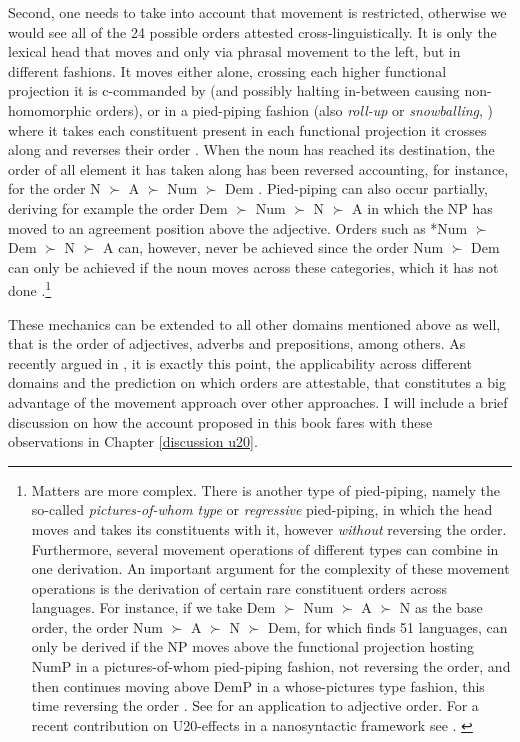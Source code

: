 \documentclass [output=book,colorlinks,citecolor=brown]{langscibook}
\begin{document}
Second, one needs to take into account that movement is restricted, otherwise we would see all of the 24 possible orders attested cross-linguistically. It is only the lexical head that moves and only via phrasal movement to the left, but in different fashions. It moves either alone, crossing each higher functional projection it is c-commanded by (and possibly halting in-between causing non-homomorphic orders), or in a pied-piping fashion (also \textit{roll-up} or \textit{snowballing}, \citealt{ross:1967:constraints}) where it takes each constituent present in each functional projection it crosses along and reverses their order \citep{cinque:2017:micro, cinque:2023:linearization}. When the noun has reached its destination, the order of all element it has taken along has been reversed accounting, for instance, for the order N $\succ$ A $\succ$ Num $\succ$ Dem \citep[318]{cinque:2005:deriving}. Pied-piping can also occur partially, deriving for example the order Dem $\succ$ Num $\succ$ N $\succ$ A in which the NP has moved to an agreement position above the adjective. Orders such as *Num $\succ$ Dem $\succ$ N $\succ$ A can, however, never be achieved since the order Num $\succ$ Dem can only be achieved if the noun moves across these categories, which it has not done \citep[317, 318]{cinque:2005:deriving}.\footnote{Matters are more complex. There is another type of pied-piping, namely the so-called \textit{pictures-of-whom type} or \textit{regressive} pied-piping, in which the head moves and takes its constituents with it, however \textit{without} reversing the order. Furthermore, several movement operations of different types can combine in one derivation. An important argument for the complexity of these movement operations is the derivation of certain rare constituent orders across languages. For instance, if we take Dem $\succ$ Num $\succ$ A $\succ$ N as the base order, the order Num $\succ$ A $\succ$ N $\succ$ Dem, for which \citet{cinque:2005:deriving, cinque:2023:linearization} finds 51 languages, can only be derived if the NP moves above the functional projection hosting NumP in a pictures-of-whom pied-piping fashion, not reversing the order, and then continues moving above DemP in a whose-pictures type fashion, this time reversing the order \citep[36]{cinque:2023:linearization}. See \citet[9–11]{cinque:2025:superiority} for an application to adjective order. For a recent contribution on U20-effects in a nanosyntactic framework see \citet{pinzin:2025:word}. \label{footnotemovement}}

These mechanics can be extended to all other domains mentioned above as well, that is the order of adjectives, adverbs and prepositions, among others. As recently argued in \citet{cinque:2025:superiority}, it is exactly this point, the applicability across different domains and the prediction on which orders are attestable, that constitutes a big advantage of the movement approach over other approaches. I will include a brief discussion on how the account proposed in this book fares with these observations in Chapter \ref{discussion u20}.
\end{document}

